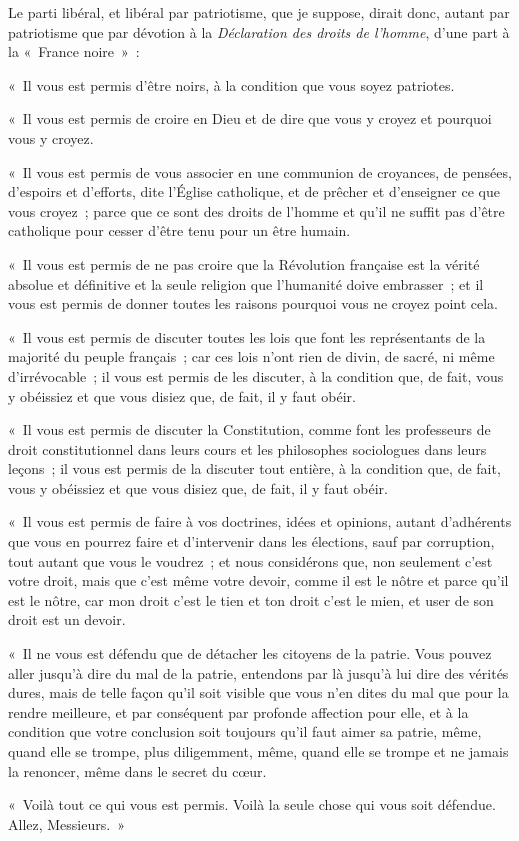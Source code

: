 \documentclass[french,twoside]{book} %
\begin{document}
Le parti libéral, et libéral par patriotisme, que je suppose, dirait donc, autant par patriotisme que par dévotion à la \emph{Déclaration des droits de l’homme}, d’une part à la « France noire » :\par
« Il vous est permis d’être noirs, à la condition que vous soyez patriotes.\par
« Il vous est permis de croire en Dieu et de dire que vous y croyez et pourquoi vous y croyez.\par
« Il vous est permis de vous associer en une communion de croyances, de pensées, d’espoirs et d’efforts, dite l’Église catholique, et de prêcher et d’enseigner ce que vous croyez ; parce que ce sont des droits de l’homme et qu’il ne suffit pas d’être catholique pour cesser d’être tenu pour un être humain.\par
« Il vous est permis de ne pas croire que la Révolution française est la vérité absolue et définitive et la seule religion que l’humanité doive embrasser ; et il vous est permis de donner toutes les raisons pourquoi vous ne croyez point cela.\par
« Il vous est permis de discuter toutes les lois que  font les représentants de la majorité du peuple français ; car ces lois n’ont rien de divin, de sacré, ni même d’irrévocable ; il vous est permis de les discuter, à la condition que, de fait, vous y obéissiez et que vous disiez que, de fait, il y faut obéir.\par
« Il vous est permis de discuter la Constitution, comme font les professeurs de droit constitutionnel dans leurs cours et les philosophes sociologues dans leurs leçons ; il vous est permis de la discuter tout entière, à la condition que, de fait, vous y obéissiez et que vous disiez que, de fait, il y faut obéir.\par
« Il vous est permis de faire à vos doctrines, idées et opinions, autant d’adhérents que vous en pourrez faire et d’intervenir dans les élections, sauf par corruption, tout autant que vous le voudrez ; et nous considérons que, non seulement c’est votre droit, mais que c’est même votre devoir, comme il est le nôtre et parce qu’il est le nôtre, car mon droit c’est le tien et ton droit c’est le mien, et user de son droit est un devoir.\par
« Il ne vous est défendu que de détacher les citoyens de la patrie. Vous pouvez aller jusqu’à dire du mal de la patrie, entendons par là jusqu’à lui dire des vérités dures, mais de telle façon qu’il soit visible que vous n’en dites du mal que pour  la rendre meilleure, et par conséquent par profonde affection pour elle, et à la condition que votre conclusion soit toujours qu’il faut aimer sa patrie, même, quand elle se trompe, plus diligemment, même, quand elle se trompe et ne jamais la renoncer, même dans le secret du cœur.\par
« Voilà tout ce qui vous est permis. Voilà la seule chose qui vous soit défendue. Allez, Messieurs. »\par
\end{document}
